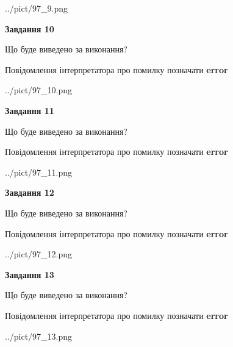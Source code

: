 \documentclass[11pt, ukrainian]{article}
\begin{document}
{\begin {large}
\begin{center}
	{../pict/97_9.png}
\end{center}
\newpage

{\begin {center}\textbf{Завдання 10}\end {center}}\par
Що буде виведено за виконання? \par
Повідомлення інтерпретатора про помилку позначати \textbf{error}

\begin{center}
	{../pict/97_10.png}
\end{center}
\newpage

{\begin {center}\textbf{Завдання 11}\end {center}}\par
Що буде виведено за виконання? \par
Повідомлення інтерпретатора про помилку позначати \textbf{error}

\begin{center}
	{../pict/97_11.png}
\end{center}
\newpage

{\begin {center}\textbf{Завдання 12}\end {center}}\par
Що буде виведено за виконання? \par
Повідомлення інтерпретатора про помилку позначати \textbf{error}

\begin{center}
	{../pict/97_12.png}
\end{center}
\newpage

{\begin {center}\textbf{Завдання 13}\end {center}}\par
Що буде виведено за виконання? \par
Повідомлення інтерпретатора про помилку позначати \textbf{error}

\begin{center}
	{../pict/97_13.png}
\end{center}
\newpage


\end{large}}
\end{document}
